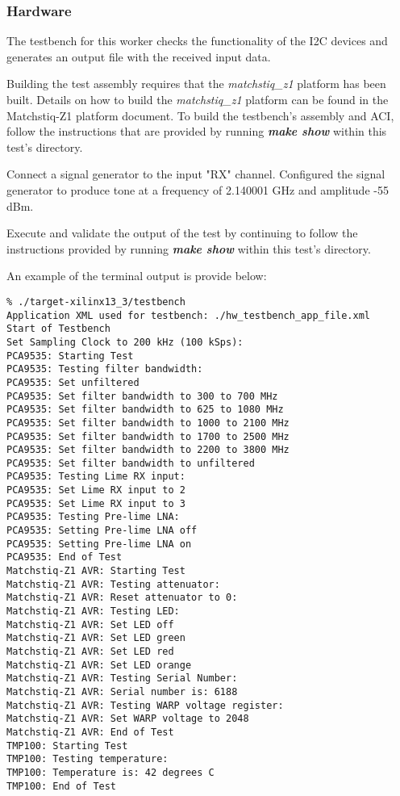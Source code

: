 \subsubsection*{Hardware}
\begin{flushleft}
The testbench for this worker checks the functionality of the I2C devices and generates an output file with the received input data. \\ \medskip

Building the test assembly requires that the \textit{matchstiq\_z1} platform has been built. Details on how to build the \textit{matchstiq\_z1} platform can be found in the Matchstiq-Z1 platform document. To build the testbench's assembly and ACI, follow the instructions that are provided by running \textbf{\textit{make show}} within this test's directory.\\ \medskip

Connect a signal generator to the input "RX" channel. Configured the signal generator to produce tone at a frequency of 2.140001 GHz and amplitude -55 dBm.\\ \medskip

Execute and validate the output of the test by continuing to follow the instructions provided by running \textbf{\textit{make show}} within this test's directory.\\ \medskip

An example of the terminal output is provide below:

\begin{lstlisting}
% ./target-xilinx13_3/testbench                 
Application XML used for testbench: ./hw_testbench_app_file.xml
Start of Testbench
Set Sampling Clock to 200 kHz (100 kSps): 
PCA9535: Starting Test 
PCA9535: Testing filter bandwidth: 
PCA9535: Set unfiltered
PCA9535: Set filter bandwidth to 300 to 700 MHz
PCA9535: Set filter bandwidth to 625 to 1080 MHz
PCA9535: Set filter bandwidth to 1000 to 2100 MHz
PCA9535: Set filter bandwidth to 1700 to 2500 MHz
PCA9535: Set filter bandwidth to 2200 to 3800 MHz
PCA9535: Set filter bandwidth to unfiltered
PCA9535: Testing Lime RX input:
PCA9535: Set Lime RX input to 2
PCA9535: Set Lime RX input to 3
PCA9535: Testing Pre-lime LNA:
PCA9535: Setting Pre-lime LNA off
PCA9535: Setting Pre-lime LNA on 
PCA9535: End of Test 
Matchstiq-Z1 AVR: Starting Test 
Matchstiq-Z1 AVR: Testing attenuator:
Matchstiq-Z1 AVR: Reset attenuator to 0:
Matchstiq-Z1 AVR: Testing LED:
Matchstiq-Z1 AVR: Set LED off
Matchstiq-Z1 AVR: Set LED green
Matchstiq-Z1 AVR: Set LED red
Matchstiq-Z1 AVR: Set LED orange
Matchstiq-Z1 AVR: Testing Serial Number:
Matchstiq-Z1 AVR: Serial number is: 6188
Matchstiq-Z1 AVR: Testing WARP voltage register: 
Matchstiq-Z1 AVR: Set WARP voltage to 2048
Matchstiq-Z1 AVR: End of Test 
TMP100: Starting Test 
TMP100: Testing temperature:
TMP100: Temperature is: 42 degrees C
TMP100: End of Test 
\end{lstlisting}


\end{flushleft}
